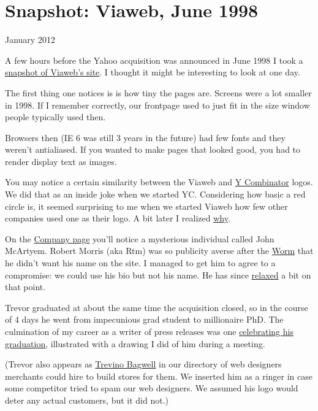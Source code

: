 \chapter{Snapshot: Viaweb, June 1998}

January 2012

A few hours before the Yahoo acquisition was announced in June 1998 I
took a \href{http://ycombinator.com/viaweb}{snapshot of Viaweb's site}.
I thought it might be interesting to look at one day.

The first thing one notices is is how tiny the pages are. Screens were a
lot smaller in 1998. If I remember correctly, our frontpage used to just
fit in the size window people typically used then.

Browsers then (IE 6 was still 3 years in the future) had few fonts and
they weren't antialiased. If you wanted to make pages that looked good,
you had to render display text as images.

You may notice a certain similarity between the Viaweb and
\href{http://ycombinator.com}{Y Combinator} logos. We did that as an
inside joke when we started YC. Considering how basic a red circle is,
it seemed surprising to me when we started Viaweb how few other
companies used one as their logo. A bit later I realized
\href{zero.html}{why}.

On the \href{http://www.ycombinator.com/viaweb/com.html}{Company page}
you'll notice a mysterious individual called John McArtyem. Robert
Morris (aka Rtm) was so publicity averse after the
\href{http://en.wikipedia.org/wiki/Morris_worm}{Worm} that he didn't
want his name on the site. I managed to get him to agree to a
compromise: we could use his bio but not his name. He has since
\href{http://ycombinator.com/people.html}{relaxed} a bit on that point.

Trevor graduated at about the same time the acquisition closed, so in
the course of 4 days he went from impecunious grad student to
millionaire PhD. The culmination of my career as a writer of press
releases was one
\href{http://ycombinator.com/viaweb/trevor.html}{celebrating his
graduation}, illustrated with a drawing I did of him during a meeting.

(Trevor also appears as
\href{http://ycombinator.com/viaweb/tlbwebdesign.html}{Trevino Bagwell}
in our directory of web designers merchants could hire to build stores
for them. We inserted him as a ringer in case some competitor tried to
spam our web designers. We assumed his logo would deter any actual
customers, but it did not.)

